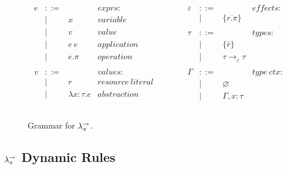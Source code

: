 \begin{figure}[h]
\vspace{-5pt}

\[
\begin{array}{lll}

\begin{array}{lllr}

e & ::= & ~ & exprs: \\
	& | & x & variable \\
	& | & v & value \\
	& | & e ~ e & application \\
	& | & e.\pi & operation \\
	&&\\

v & ::= & ~ & values: \\
	& | & r & resource~literal \\
	& | & \lambda x: \tau.e & abstraction \\
	&&\\

\end{array}

& ~~~~~~~~&

\begin{array}{lllr}

\varepsilon & ::= & ~ & effects: \\
	& | & \{ \overline{r.\pi} \} \\
	&&\\

\tau & ::= & ~ & types: \\
		& | & \{ \bar r \} \\
		& | & \tau \rightarrow_{\varepsilon} \tau \\ 
		&&\\

\Gamma & ::= & ~ & type~ctx: \\
				& | & \varnothing \\
				& | & \Gamma, x: \tau \\
				&&\\
\end{array}

\end{array}
\]

\vspace{-7pt}
\caption{Grammar for $\lambda^{\rightarrow}_{\pi}$.}
\label{This is the label.}
\end{figure}


 
 
\subsection{$\lambda^{\rightarrow}_{\pi}$ Dynamic Rules}

